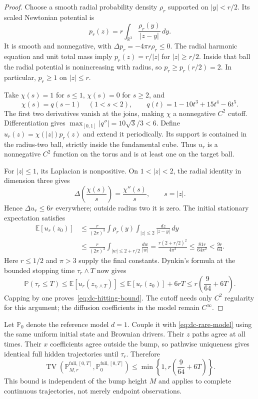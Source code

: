 \begin{proof}
Choose a smooth radial probability density $\rho_r$ supported on
$|y|<r/2$. Its scaled Newtonian potential is
\[
 p_r(z)=r\int_{\mathbb R^3}\frac{\rho_r(y)}{|z-y|}\,dy.
\]
It is smooth and nonnegative, with
$\Delta p_r=-4\pi r\rho_r\leq0$. The radial harmonic equation and unit
total mass imply $p_r(z)=r/|z|$ for $|z|\geq r/2$.
Inside that ball the radial potential is nonincreasing with radius, so
$p_r\geq p_r(r/2)=2$. In particular, $p_r\geq1$ on $|z|\leq r$.

Take $\chi(s)=1$ for $s\leq1$, $\chi(s)=0$ for $s\geq2$, and
\[
 \chi(s)=q(s-1)\quad(1<s<2),\qquad
 q(t)=1-10t^3+15t^4-6t^5.
\]
The first two derivatives vanish at the joins, making $\chi$ a
nonnegative $C^2$ cutoff. Differentiation gives
$\max_{[0,1]}|q''|=10\sqrt3/3<6$.
Define $u_r(z)=\chi(|z|)p_r(z)$ and extend it periodically.
Its support is contained in the radius-two ball, strictly inside the
fundamental cube. Thus $u_r$ is a nonnegative $C^2$ function on the torus
and is at least one on the target ball.

For $|z|\leq1$, its Laplacian is nonpositive. On $1<|z|<2$, the radial
identity in dimension three gives
\[
 \Delta\left(\frac{\chi(s)}s\right)=\frac{\chi''(s)}s,
 \qquad s=|z|.
\]
Hence $\Delta u_r\leq6r$ everywhere; outside radius two it is zero.
The initial stationary expectation satisfies
\begin{align*}
 \mathbb E[u_r(z_0)]
 &\leq\frac r{(2\pi)^3}
   \int\rho_r(y)\int_{|z|\leq2}\frac{dz}{|z-y|}\,dy\\
 &\leq\frac r{(2\pi)^3}
      \int_{|w|\leq2+r/2}\frac{dw}{|w|}
 =\frac{r(2+r/2)^2}{4\pi^2}
 \leq\frac{81r}{64\pi^2}<\frac{9r}{64}.
\end{align*}
Here $r\leq1/2$ and $\pi>3$ supply the final constants.
Dynkin's formula at the bounded stopping time $\tau_r\wedge T$ now gives
\[
 \mathbb P(\tau_r\leq T)
 \leq\mathbb E[u_r(z_{\tau_r\wedge T})]
 \leq\mathbb E[u_r(z_0)]+6rT
 \leq r\left(\frac9{64}+6T\right).
\]
Capping by one proves~\eqref{eq:dc-hitting-bound}. The cutoff needs only
$C^2$ regularity for this argument; the diffusion coefficients in the
model remain $C^\infty$.
\end{proof}

Let $\mathbb P_0$ denote the reference model $d=1$. Couple it with
\eqref{eq:dc-rare-model} using the same uniform initial state and Brownian
drivers. Their $z$ paths agree at all times. Their $x$ coefficients agree
outside the bump, so pathwise uniqueness gives identical full hidden
trajectories until $\tau_r$. Therefore
\begin{equation}
 \operatorname{TV}\!\left(
 \mathbb P_{M,r}^{\mathrm{full},[0,T]},
 \mathbb P_0^{\mathrm{full},[0,T]}\right)
 \leq\min\left\{1,r\left(\frac9{64}+6T\right)\right\}.
 \label{eq:dc-full-path-tv}
\end{equation}
This bound is independent of the bump height $M$ and applies to complete
continuous trajectories, not merely endpoint observations.

